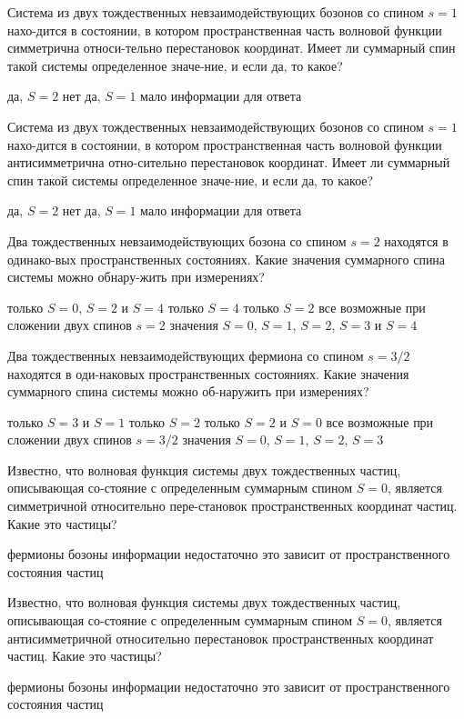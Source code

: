 \documentclass[11pt,a4paper]{exam}
\begin{document}
\begin{questions}
\question Система из двух тождественных невзаимодействующих бозонов со спином $s = 1$ нахо-дится в состоянии, в котором пространственная часть волновой функции симметрична относи-тельно перестановок координат. Имеет ли суммарный спин такой системы определенное значе-ние, и если да, то какое? 
\begin{choices}
\choice да, $S = 2$    
\choice нет      
\choice да, $S = 1$    
\choice мало информации для ответа
\end{choices}

\question Система из двух тождественных невзаимодействующих бозонов со спином $s = 1$ нахо-дится в состоянии, в котором пространственная часть волновой функции антисимметрична отно-сительно перестановок координат. Имеет ли суммарный спин такой системы определенное значе-ние, и если да, то какое? 
\begin{choices}
\choice да, $S = 2$    
\choice нет      
\choice да, $S = 1$    
\choice мало информации для ответа
\end{choices}

\question Два тождественных невзаимодействующих бозона со спином $s = 2$ находятся в одинако-вых пространственных состояниях. Какие значения суммарного спина системы можно обнару-жить при измерениях?
\begin{choices}
\choice только $S = 0$, $S = 2$ и $S = 4$
\choice только $S = 4$
\choice только $S = 2$ 
\choice все возможные при сложении двух спинов $s = 2$ значения $S = 0$, $S = 1$, $S = 2$, $S = 3$ и $S = 4$
\end{choices}

\question Два тождественных невзаимодействующих фермиона со спином $s = 3/2$ находятся в оди-наковых пространственных состояниях. Какие значения суммарного спина системы можно об-наружить при измерениях?
\begin{choices}
\choice только $S = 3$ и $S = 1$
\choice только $S = 2$
\choice только $S = 2$ и $S = 0$
\choice все возможные при сложении двух спинов $s = 3/2$ значения $S = 0$, $S = 1$, $S = 2$, $S = 3$
\end{choices}

\question Известно, что волновая функция системы двух тождественных частиц, описывающая со-стояние с определенным суммарным спином $S = 0$, является симметричной относительно пере-становок пространственных координат частиц. Какие это частицы?
\begin{choices}
\choice фермионы
\choice бозоны
\choice информации недостаточно
\choice это зависит от пространственного состояния частиц
\end{choices}

\question Известно, что волновая функция системы двух тождественных частиц, описывающая со-стояние с определенным суммарным спином $S = 0$, является антисимметричной относительно перестановок пространственных координат частиц. Какие это частицы?
\begin{choices}
\choice фермионы
\choice бозоны
\choice информации недостаточно
\choice это зависит от пространственного состояния частиц
\end{choices} 

\end{questions}
\end{document}

